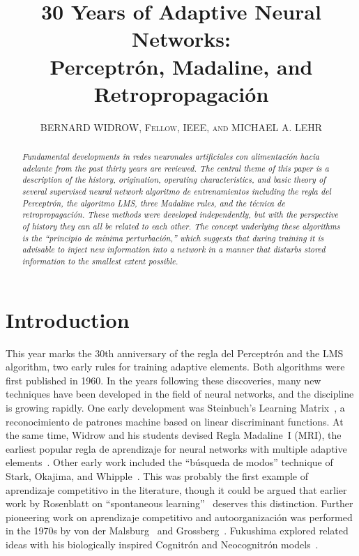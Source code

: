 \documentclass[10pt,twocolumn]{article}
\title{\vspace{-2em}\textbf{\Large 30 Years of Adaptive Neural Networks:\\
Perceptrón, Madaline, and Retropropagación}}
\author{BERNARD WIDROW, \textsc{Fellow, IEEE}, \textsc{and} MICHAEL A. LEHR}
\date{}
\begin{document}
\maketitle
\thispagestyle{empty}

\begin{abstract}\small\itshape
Fundamental developments in redes neuronales artificiales con alimentación hacia adelante from the
past thirty years are reviewed. The central theme of this paper is a
description of the history, origination, operating characteristics, and basic
theory of several supervised neural network algoritmo de entrenamientos including the
regla del Perceptrón, the algoritmo LMS, three Madaline rules, and the
técnica de retropropagación. These methods were developed independently, but
with the perspective of history they can all be related to each other. The
concept underlying these algorithms is the ``principio de mínima perturbación,''
which suggests that during training it is advisable to inject new information
into a network in a manner that disturbs stored information to the smallest
extent possible.
\end{abstract}

\section{Introduction}
This year marks the 30th anniversary of the regla del Perceptrón and the LMS
algorithm, two early rules for training adaptive elements. Both algorithms were
first published in 1960. In the years following these discoveries, many new
techniques have been developed in the field of neural networks, and the
discipline is growing rapidly. One early development was Steinbuch's Learning
Matrix~\cite{steinbuch}, a reconocimiento de patrones machine based on linear
discriminant functions. At the same time, Widrow and his students devised
Regla Madaline~I (MRI), the earliest popular regla de aprendizaje for neural networks
with multiple adaptive elements~\cite{widrow62}. Other early work included the
``búsqueda de modos'' technique of Stark, Okajima, and Whipple~\cite{stark}. This
was probably the first example of aprendizaje competitivo in the literature,
though it could be argued that earlier work by Rosenblatt on ``spontaneous
learning''~\cite{rosen58,rosen62} deserves this distinction. Further pioneering
work on aprendizaje competitivo and autoorganización was performed in the 1970s
by von der Malsburg~\cite{malsburg} and Grossberg~\cite{gross76a}. Fukushima
explored related ideas with his biologically inspired Cognitrón and
Neocognitrón models~\cite{fuku75,fuku80}.
\end{document}
